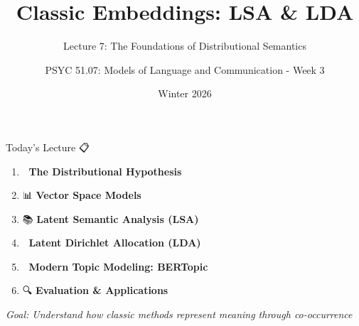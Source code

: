 \documentclass[aspectratio=169]{beamer}
\title{Classic Embeddings: LSA \& LDA}
\subtitle{Lecture 7: The Foundations of Distributional Semantics}
\author{PSYC 51.07: Models of Language and Communication - Week 3}
\date{Winter 2026}
\begin{document}
\begin{frame}[shrink=10]
\titlepage
\end{frame}

\begin{frame}[shrink=10]{Today's Lecture 📋}
\large
\begin{enumerate}\setlength{\itemsep}{0pt}
    \item 🧠 \textbf{The Distributional Hypothesis}
    \item 📊 \textbf{Vector Space Models}
    \item 📚 \textbf{Latent Semantic Analysis (LSA)}
    \item 🎲 \textbf{Latent Dirichlet Allocation (LDA)}
    \item 🎨 \textbf{Modern Topic Modeling: BERTopic}
    \item 🔍 \textbf{Evaluation \& Applications}
\end{enumerate}

\vspace{1em}
\textit{Goal: Understand how classic methods represent meaning through co-occurrence}
\end{frame}
\end{document}
